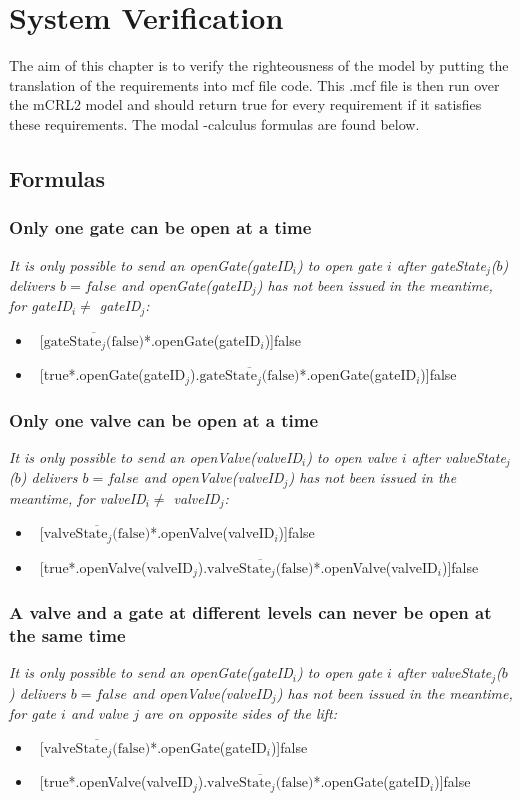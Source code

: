 \section{System Verification}
The aim of this chapter is to verify the righteousness of the model by putting the translation of the requirements into mcf file code. This .mcf file is then run over the mCRL2 model and should return true for every requirement if it satisfies these requirements. The modal {\textmu}-calculus formulas are found below.
\subsection{Formulas}
\subsubsection{Only one gate can be open at a time}
\textit{It is only possible to send an openGate(gateID$_i$) to open gate $i$ after gateState$_j$($ b $) delivers $b = false$ and openGate(gateID$_j$) has not been issued in the meantime, for gateID$_i \neq$ gateID$_j$:}
	\begin{itemize}
		\item ~[$\overline{\textrm{gateState$_j$(false)}}$*.openGate(gateID$_i$)]false
		\item ~[true*.openGate(gateID$_j$).$\overline{\textrm{gateState$_j$(false)}}$*.openGate(gateID$_i$)]false
	\end{itemize}	
	
\subsubsection{Only one valve can be open at a time}
\textit{It is only possible to send an openValve(valveID$_i$) to open valve $i$ after \linebreak valveState$_j$($ b $) delivers $b = false$ and openValve(valveID$_j$) has not been issued in the meantime, for valveID$_i \neq$ valveID$_j$:}
	\begin{itemize}
		\item ~[$\overline{\textrm{valveState$_j$(false)}}$*.openValve(valveID$_i$)]false
		\item ~[true*.openValve(valveID$_j$).$\overline{\textrm{valveState$_j$(false)}}$*.openValve(valveID$_i$)]false
	\end{itemize}
	
\subsubsection{A valve and a gate at different levels can never be open at the same time}
\textit{It is only possible to send an openGate(gateID$_i$) to open gate $i$ after valveState$_j$($ b $) delivers $b = false$ and openValve(valveID$_j$) has not been issued in the meantime, for gate $i$ and valve $j$ are on opposite sides of the lift:}
	\begin{itemize}
		\item ~[$\overline{\textrm{valveState$_j$(false)}}$*.openGate(gateID$_i$)]false
		\item ~[true*.openValve(valveID$_j$).$\overline{\textrm{valveState$_j$(false)}}$*.openGate(gateID$_i$)]false
	\end{itemize}

